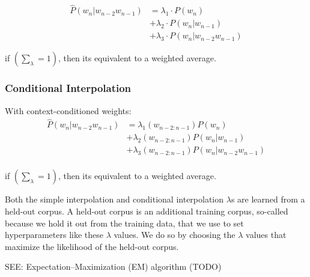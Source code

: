 \begin{align*}
    \hat{P}(w_n|w_{n-2}w_{n-1}) &= \lambda_1 \cdot P(w_n)  \\ 
    &+ \lambda_2 \cdot P(w_n|w_{n-1}) \\ 
    &+ \lambda_3 \cdot P(w_n|w_{n-2}w_{n-1}) 
\end{align*}


if \( \left( \sum_\lambda = 1 \right)\), then its equivalent to a weighted average.

\subsubsection{Conditional Interpolation}
With context-conditioned weights:
\begin{align*}
    \hat{P}(w_n|w_{n-2}w_{n-1}) &= \lambda_1(w_{n-2:n-1})P(w_n) \\ 
    &+ \lambda_2(w_{n-2:n-1})P(w_n|w_{n-1}) \\ 
    &+ \lambda_3(w_{n-2:n-1})P(w_n|w_{n-2}w_{n-1}) \\ 
\end{align*}

if \( \left( \sum_\lambda = 1 \right)\), then its equivalent to a weighted average.

Both the simple interpolation and conditional interpolation $\lambda$s are learned from a held-out corpus. A held-out corpus is an additional training corpus, so-called because we hold it out from the training data, that we use to set hyperparameters like these $\lambda$ values. We do so by choosing the $\lambda$ values that maximize the likelihood of the held-out corpus.

SEE: Expectation–Maximization (EM) algorithm (TODO)


